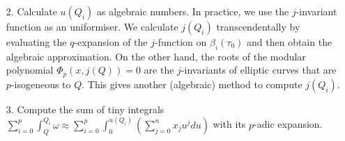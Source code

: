 \begin{algorithm}
\begin{enumerate}
\begin{enumerate}
\end{enumerate}


\item[2.] \label{algstep:tiny_2} Calculate $u(Q_i)$ as algebraic numbers. In practice, we use the $j$-invariant function as an uniformiser. We calculate $j(Q_i)$ transcendentally by evaluating the $q$-expansion of the $j$-function on $\beta_i(\tau_0)$ and then obtain the algebraic approximation. On the other hand, the roots of the modular polynomial $\Phi_p(x,j(Q)) = 0$ are the $j$-invariants of elliptic curves that are $p$-isogeneous to $Q$. This gives another (algebraic) method to compute $j(Q_i)$.

\item[3.] \label{algstep:tiny_3} Compute the sum of tiny integrals $\sum\limits_{i=0}^p\int_{Q}^{Q_i}\omega \approx \sum\limits_{i=0}^p \int^{u(Q_i)}_0 (\sum_{j=0}^n x_j u^j du)$ with its $p$-adic expansion.
\end{enumerate}
\end{algorithm}